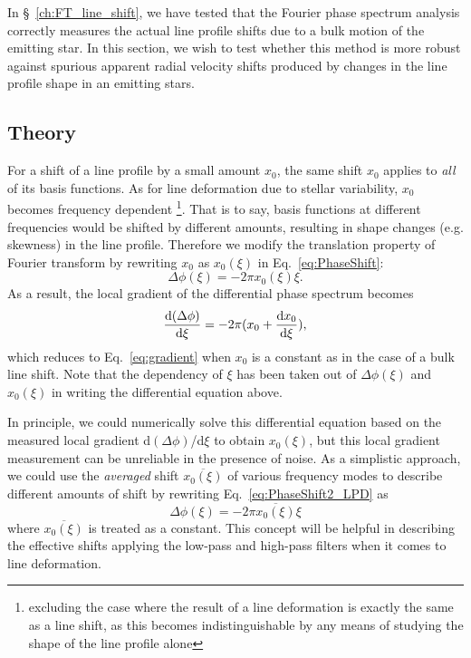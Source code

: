 In \S~\ref{ch:FT_line_shift}, we have tested that the Fourier phase spectrum analysis correctly measures the actual line profile shifts due to a bulk motion of the emitting star. In this section, we wish to test whether this method is more robust against spurious apparent radial velocity shifts produced by changes in the line profile shape in an emitting stars.

\subsection{Theory}
\label{sec:LD_Theory}

For a shift of a line profile by a small amount $x_0$, the same shift $x_0$ applies to \textit{all} of its basis functions. As for line deformation due to stellar variability, $x_0$ becomes frequency dependent \footnote{excluding the case where the result of a line deformation is exactly the same as a line shift, as this becomes indistinguishable by any means of studying the shape of the line profile alone}. That is to say, basis functions at different frequencies would be shifted by different amounts, resulting in shape changes (e.g. skewness) in the line profile. 
Therefore we modify the translation property of Fourier transform by rewriting $x_0$ as $x_0(\xi)$ in Eq.~\ref{eq:PhaseShift}:
\begin{equation}
	\Delta \phi(\xi) = -2 \pi x_0(\xi) \xi.
\label{eq:PhaseShift2_LPD}
\end{equation}
As a result, the local gradient of the differential phase spectrum becomes 
\begin{equation}
	\dv{(\Delta \phi)}{\xi} = -2 \pi (x_0 + \dv{x_0}{\xi}),
\label{eq:PhaseShift3_LPD}
\end{equation}
which reduces to Eq.~\ref{eq:gradient} when $x_0$ is a constant as in the case of a bulk line shift.
Note that the dependency of $\xi$ has been taken out of $\Delta \phi(\xi)$ and 
$x_0(\xi)$ in writing the differential equation above. 

In principle, we could numerically solve this differential equation based on the measured local gradient d$(\Delta \phi)$/d$\xi$
to obtain $x_0(\xi)$, but this local gradient measurement can be unreliable in the presence of noise. As a simplistic approach, we could use the \textit{averaged} shift $\overline{x_0(\xi)}$ of various frequency modes to describe different amounts of shift by rewriting Eq.~\ref{eq:PhaseShift2_LPD} as 
\begin{equation}
	\Delta \phi(\xi) = -2 \pi \overline{x_0(\xi)} \xi
\end{equation}
where $\overline{x_0(\xi)}$ is treated as a constant. This concept will be helpful in describing the effective shifts applying the low-pass and high-pass filters when it comes to line deformation.

